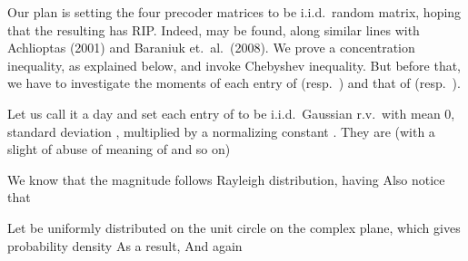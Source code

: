 Our plan is setting the four precoder matrices to be i.i.d.\ random matrix, hoping that the resulting  has RIP.
Indeed,  may be found, along similar lines with Achlioptas (2001) and Baraniuk et.\ al.\ (2008).
We prove a concentration inequality, as explained below, and invoke Chebyshev inequality.
But before that, we have to investigate the moments of each entry of  (resp.\ ) and that of  (resp.\ ).

Let us call it a day and set each entry of  to be i.i.d.\ Gaussian r.v.\ with mean 0, standard deviation , multiplied by a normalizing constant .
They are (with a slight of abuse of meaning of  and so on)

We know that the magnitude  follows Rayleigh distribution, having
Also notice that

Let  be uniformly distributed on the unit circle on the complex plane, which gives probability density
As a result,
And again

